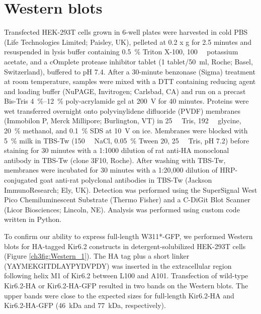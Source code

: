 \section{Western blots}
Transfected HEK-293T cells grown in 6-well plates were harvested in cold PBS (Life Technologies Limited; Paisley, UK), pelleted at 0.2 x g for 2.5 minutes and resuspended in lysis buffer containing \SI{0.5}{\percent} Triton X-100, \SI{100}{\milli\Molar} potassium acetate, and a cOmplete protease inhibitor tablet (1 tablet/\SI{50}{\milli\litre}, Roche; Basel, Switzerland), buffered to pH 7.4.
After a 30-minute benzonase (Sigma) treatment at room temperature, samples were mixed with a DTT containing reducing agent and loading buffer (NuPAGE, Invitrogen; Carlsbad, CA) and run on a precast Bis-Tris \SIrange{4}{12}{\percent} poly-acrylamide gel at \SI{200}{\volt} for 40 minutes.
Proteins were wet transferred overnight onto polyvinylidene difluoride (PVDF) membranes (Immobilon P, Merck Millipore; Burlington, VT) in \SI{25}{\milli\Molar} Tris, \SI{192}{\milli\Molar} glycine, \SI{20}{\percent} methanol, and \SI{0.1}{\percent} SDS at \SI{10}{\volt} on ice.
Membranes were blocked with \SI{5}{\percent} milk in TBS-Tw (\SI{150}{\milli\Molar} NaCl, \SI{0.05}{\percent} Tween 20, \SI{25}{\milli\Molar} Tris, pH 7.2) before staining for 30 minutes with a 1:1000 dilution of rat anti-HA monoclonal antibody in TBS-Tw (clone 3F10, Roche).
After washing with TBS-Tw, membranes were incubated for 30 minutes with a 1:20,000 dilution of HRP-conjugated goat anti-rat polyclonal antibodies in TBS-Tw (Jackson ImmunoResearch; Ely, UK).
Detection was performed using the SuperSignal West Pico Chemiluminescent Substrate (Thermo Fisher) and a C-DiGit Blot Scanner (Licor Biosciences; Lincoln, NE).
Analysis was performed using custom code written in Python.

To confirm our ability to express full-length W311*-GFP, we performed Western blots for HA-tagged Kir6.2 constructs in detergent-solubilized HEK-293T cells (Figure \ref{ch3fig:Western_1}).
The HA tag plus a short linker (YAYMEKGITDLAYPYDVPDY) was inserted in the extracellular region following helix M1 of Kir6.2 between L100 and A101.
Transfection of wild-type Kir6.2-HA or Kir6.2-HA-GFP resulted in two bands on the Western blots.
The upper bands were close to the expected sizes for full-length Kir6.2-HA and Kir6.2-HA-GFP (\SI{46}{\kilo\dalton} and \SI{77}{\kilo\dalton}, respectively).

